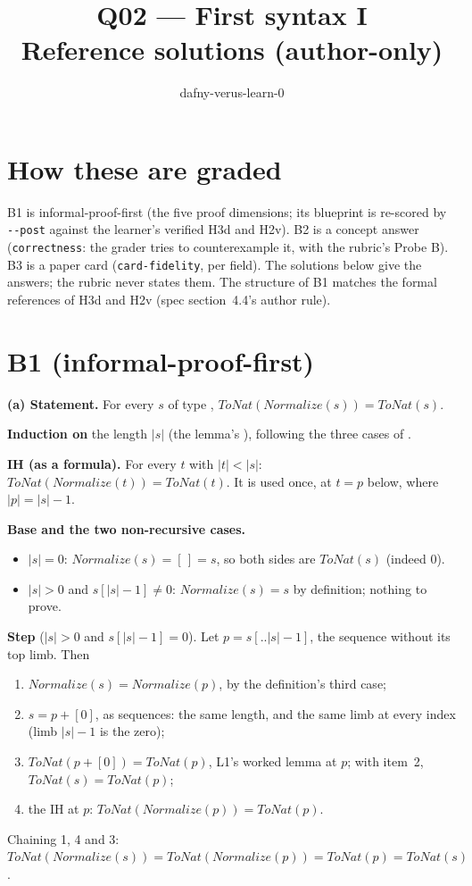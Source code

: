 \documentclass[11pt]{article}
\title{Q02 --- First syntax I \\ \large Reference solutions (author-only)}
\author{dafny-verus-learn-0}
\date{}
\begin{document}
\maketitle

\section*{How these are graded}
B1 is informal-proof-first (the five proof dimensions; its blueprint is
re-scored by \verb+--post+ against the learner's verified H3d and H2v). B2 is a
concept answer (\texttt{correctness}: the grader tries to counterexample it,
with the rubric's Probe B). B3 is a paper card (\texttt{card-fidelity}, per
field). The solutions below give the answers; the rubric never states them.
The structure of B1 matches the formal references of H3d and H2v (spec
section~4.4's author rule).

\section*{B1 (informal-proof-first)}

\textbf{(a) Statement.} For every $s$ of type ,
$\mathit{ToNat}(\mathit{Normalize}(s)) = \mathit{ToNat}(s)$.

\textbf{Induction on} the length $|s|$ (the lemma's ),
following the three cases of .

\textbf{IH (as a formula).} For every $t$ with $|t| < |s|$:
$\mathit{ToNat}(\mathit{Normalize}(t)) = \mathit{ToNat}(t)$. It is used once,
at $t = p$ below, where $|p| = |s| - 1$.

\textbf{Base and the two non-recursive cases.}
\begin{itemize}
\item $|s| = 0$: $\mathit{Normalize}(s) = [\,] = s$, so both sides are
  $\mathit{ToNat}(s)$ (indeed 0).
\item $|s| > 0$ and $s[|s|-1] \neq 0$: $\mathit{Normalize}(s) = s$ by
  definition; nothing to prove.
\end{itemize}

\textbf{Step} ($|s| > 0$ and $s[|s|-1] = 0$). Let $p = s[..|s|-1]$, the
sequence without its top limb. Then
\begin{enumerate}
\item $\mathit{Normalize}(s) = \mathit{Normalize}(p)$, by the definition's third
  case;
\item $s = p + [0]$, as sequences: the same length, and the same limb at every
  index (limb $|s|-1$ is the zero);
\item $\mathit{ToNat}(p + [0]) = \mathit{ToNat}(p)$, L1's worked lemma
   at $p$; with item~2, $\mathit{ToNat}(s) =
  \mathit{ToNat}(p)$;
\item the IH at $p$: $\mathit{ToNat}(\mathit{Normalize}(p)) = \mathit{ToNat}(p)$.
\end{enumerate}
Chaining 1, 4 and 3: $\mathit{ToNat}(\mathit{Normalize}(s)) =
\mathit{ToNat}(\mathit{Normalize}(p)) = \mathit{ToNat}(p) = \mathit{ToNat}(s)$.
\end{document}
